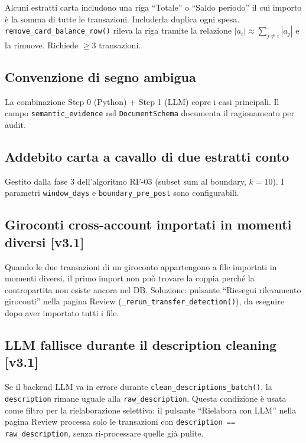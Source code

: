\documentclass[11pt, a4paper]{article}
\begin{document}
Alcuni estratti carta includono una riga ``Totale'' o ``Saldo periodo'' il cui importo
è la somma di tutte le transazioni. Includerla duplica ogni spesa.
\texttt{remove\_card\_balance\_row()} rileva la riga tramite la relazione
$|a_i| \approx \sum_{j \neq i} |a_j|$ e la rimuove. Richiede $\geq 3$ transazioni.

\subsection{Convenzione di segno ambigua}

La combinazione Step 0 (Python) + Step 1 (LLM) copre i casi principali.
Il campo \texttt{semantic\_evidence} nel \texttt{DocumentSchema} documenta il
ragionamento per audit.

\subsection{Addebito carta a cavallo di due estratti conto}

Gestito dalla fase 3 dell'algoritmo RF-03 (subset sum al boundary,
$k = 10$). I parametri \texttt{window\_days} e \texttt{boundary\_pre\_post}
sono configurabili.

\subsection{Giroconti cross-account importati in momenti diversi [v3.1]}

Quando le due transazioni di un giroconto appartengono a file importati in momenti
diversi, il primo import non può trovare la coppia perché la contropartita non esiste
ancora nel DB. Soluzione: pulsante ``Riesegui rilevamento giroconti'' nella pagina
Review (\texttt{\_rerun\_transfer\_detection()}), da eseguire dopo aver importato
tutti i file.

\subsection{LLM fallisce durante il description cleaning [v3.1]}

Se il backend LLM va in errore durante \texttt{clean\_descriptions\_batch()}, la
\texttt{description} rimane uguale alla \texttt{raw\_description}. Questa condizione
è usata come filtro per la rielaborazione selettiva: il pulsante ``Rielabora con LLM''
nella pagina Review processa solo le transazioni con
\texttt{description == raw\_description}, senza ri-processare quelle già pulite.
\end{document}
